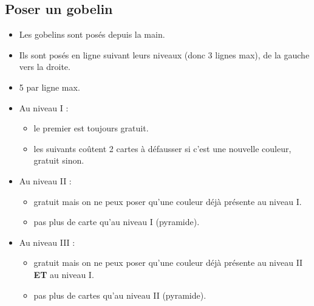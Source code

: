 \documentclass[10pt, a4paper]{article}	%
\begin{document}
\begin{multicols}{3}
\subsection{Poser un gobelin}
\begin{itemize}
	\item Les gobelins sont posés depuis la main.
	\item Ils sont posés en ligne suivant leurs niveaux (donc 3 lignes max), de la gauche vers la droite.
	\item 5 par ligne max.
	\item Au niveau I :
	\begin{itemize}
		\item le premier est toujours gratuit.
		\item les suivants coûtent 2 cartes à défausser si c'est une nouvelle couleur, gratuit sinon.
	\end{itemize}
	\item Au niveau II :
	\begin{itemize}
		\item gratuit mais on ne peux poser qu’une couleur déjà présente au niveau I.
		\item pas plus de carte qu'au niveau I (pyramide).
	\end{itemize}
	\item Au niveau III :
	\begin{itemize}
		\item gratuit mais on ne peux poser qu'une couleur déjà présente au niveau II \textbf{ET} au niveau I.
		\item pas plus de cartes qu’au niveau II (pyramide).
	\end{itemize}
\end{itemize}


\end{multicols}
\end{document}
